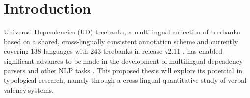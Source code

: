 \section{Introduction}


Universal Dependencies (UD) treebanks, a multilingual collection of treebanks based on a shared, cross-lingually consistent annotation scheme \citet{nivre2020} and currently covering 138 languages with 243 treebanks in release v2.11 \cite{universaldep}, has enabled significant advances to be made in the development of multilingual dependency parsers and other NLP tasks \citep{zeman2017, zeman2018}. This proposed thesis will explore its potential in typological research, namely through a cross-lingual quantitative study of verbal valency systems. 